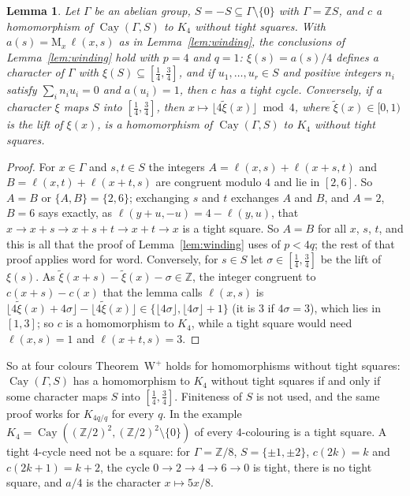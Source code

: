 \documentclass[11pt,a4paper]{amsart}
\newtheorem{lemma}{Lemma}
\theoremstyle{remark}
\newcommand{\Z}{\mathbb{Z}}
\newcommand{\Cay}{\operatorname{Cay}}
\begin{document}
\begin{lemma}\label{lem:square}
Let $\Gamma$ be an abelian group, $S=-S\subseteq\Gamma\setminus\{0\}$ with $\Gamma=\Z S$, and $c$ a homomorphism of
$\Cay(\Gamma,S)$ to $K_4$ without tight squares. With $a(s)=\mathrm M_x\,\ell(x,s)$ as in Lemma~\ref{lem:winding},
the conclusions of Lemma~\ref{lem:winding} hold with $p=4$ and $q=1$: $\xi(s)=a(s)/4$ defines a character of
$\Gamma$ with $\xi(S)\subseteq[\frac14,\frac34]$, and if $u_1,\dots,u_r\in S$ and positive integers $n_i$ satisfy
$\sum_in_iu_i=0$ and $a(u_i)=1$, then $c$ has a tight cycle. Conversely, if a character $\xi$ maps $S$ into
$[\frac14,\frac34]$, then $x\mapsto\lfloor4\tilde\xi(x)\rfloor\bmod4$, where $\tilde\xi(x)\in[0,1)$ is the lift of
$\xi(x)$, is a homomorphism of $\Cay(\Gamma,S)$ to $K_4$ without tight squares.
\end{lemma}

\begin{proof}
For $x\in\Gamma$ and $s,t\in S$ the integers $A=\ell(x,s)+\ell(x+s,t)$ and $B=\ell(x,t)+\ell(x+t,s)$ are congruent
modulo $4$ and lie in $[2,6]$. So $A=B$ or $\{A,B\}=\{2,6\}$; exchanging $s$ and $t$ exchanges $A$ and $B$, and
$A=2$, $B=6$ says exactly, as $\ell(y+u,-u)=4-\ell(y,u)$, that $x\to x+s\to x+s+t\to x+t\to x$ is a tight square.
So $A=B$ for all $x$, $s$, $t$, and this is all that the proof of Lemma~\ref{lem:winding} uses of $p<4q$; the rest
of that proof applies word for word. Conversely, for $s\in S$ let $\sigma\in[\frac14,\frac34]$ be the lift of
$\xi(s)$. As $\tilde\xi(x+s)-\tilde\xi(x)-\sigma\in\Z$, the integer congruent to $c(x+s)-c(x)$ that the lemma
calls $\ell(x,s)$ is $\lfloor4\tilde\xi(x)+4\sigma\rfloor-\lfloor4\tilde\xi(x)\rfloor\in\{\lfloor4\sigma\rfloor,
\lfloor4\sigma\rfloor+1\}$ (it is $3$ if $4\sigma=3$), which lies in $[1,3]$; so $c$ is a homomorphism to $K_4$,
while a tight square would need $\ell(x,s)=1$ and $\ell(x+t,s)=3$.
\end{proof}

So at four colours Theorem~W$^+$ holds for homomorphisms without tight squares: $\Cay(\Gamma,S)$ has a homomorphism
to $K_4$ without tight squares if and only if some character maps $S$ into $[\frac14,\frac34]$. Finiteness of $S$
is not used, and the same proof works for $K_{4q/q}$ for every $q$. In the example
$K_4=\Cay((\Z/2)^2,(\Z/2)^2\setminus\{0\})$ of \cite{Winding} every $4$-colouring is a tight square. A tight
$4$-cycle need not be a square: for $\Gamma=\Z/8$, $S=\{\pm1,\pm2\}$, $c(2k)=k$ and $c(2k+1)=k+2$, the cycle
$0\to2\to4\to6\to0$ is tight, there is no tight square, and $a/4$ is the character $x\mapsto5x/8$.
\end{document}
